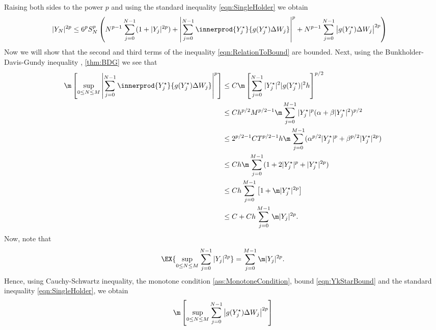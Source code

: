 \begin{pf}
	Raising both sides to the power $p$ and using the standard inequality \eqref{eqn:SingleHolder} we obtain
	\begin{align}\label{eqn:RelationToBound}
		|Y_N|^{2p}	
			&\leq
				6^{p} S_N^p
				\left(
					N^{p-1}
						\sum_{j=0}^{N-1}
						(1+|Y_j|^{2p})	
					+
					\left|
						\sum_{j=0}^{N-1}
						\innerprod{Y_j^{\star}}{g(Y_j^{\star}) \Delta W_j}
					\right|^p
					+
					N^{p-1}
					\sum_{j=0}^{N-1}
						\left|
							g(Y_j^{\star}) \Delta W_j
						\right|^{2 p}				
				\right)
	\end{align}
	Now we will show that the second and third terms of the inequality \eqref{eqn:RelationToBound} are bounded.
	Next, using the Bunkholder-Davis-Gundy inequality
	\cite[Thm 7.3 pg. 40]{Mao2007},
	\eqref{thm:BDG}
	we see that
	\begin{align}\label{eqn:BoundSecondTerm}
		\m
		\left[
			\sup_{0\leq N \leq M}
			\left|
				\sum_{j=0}^{N-1}
					\innerprod{Y_j^{\star}}{g(Y_j^{\star})\Delta W_j}
			\right|^{p}
		\right]
		&\leq
			C\m
			\left[
				\sum_{j=0}^{N-1}
					|Y_j^{\star}|^2
					|g(Y_j^{\star})|^2
					h
			\right]^{p/2}
			\notag\\
		&\leq
			C h^{p/2}M^{p/2-1}
			\m
				\sum_{j=0}^{M-1}
					|Y_j^{\star}|^p (\alpha +\beta |Y_j^{\star}|^2)^{p/2}
			\notag\\
		&\leq
			2^{p/2-1}C T^{p/2-1} h  
			\m
			\sum_{j=0}^{M-1}
				(\alpha^{p/2}|Y_j^{\star}|^p +\beta^{p/2} |Y_j^{\star}|^{2p})
			\notag\\
		&\leq
			C h
			\m
			\sum_{j=0}^{M-1}
				(1+2|Y_j^{\star}|^p + |Y_j^{\star}|^{2p})
			\notag\\
		&\leq
			C h 
			\sum_{j=0}^{M-1}
			\left[
				1+\m|Y_j^{\star}|^{2p}
			\right]
			\notag\\
		&\leq
			C 
			+ 
			C h 
			\sum_{j=0}^{M-1}
				\m|Y_j|^{2p}	
			.
	\end{align}
	Now, note that 
	\begin{equation}\label{eqn:SupOfSum}
		\EX{
			\sup_{0\leq N\leq M}
				\sum_{j=0}^{N-1}
				|Y_j|^{2p}
		}
		=
		\sum_{j=0}^{M-1}
			\m|Y_j|^{2p}.
	\end{equation}
	Hence, using Cauchy-Schwartz inequality, the monotone condition 
	\eqref{ass:MonotoneCondition}, bound \eqref{eqn:YkStarBound}
	and the standard inequality \eqref{eqn:SingleHolder}, we obtain
	\begin{align}
	\m\left[
		\sup_{0\leq N \leq M}
			\sum_{j=0}^{N-1}
			\left|
				g(Y_j^{\star})\Delta W_j
			\right|^{2p}	
		\right]

\end{align}
\end{pf}
